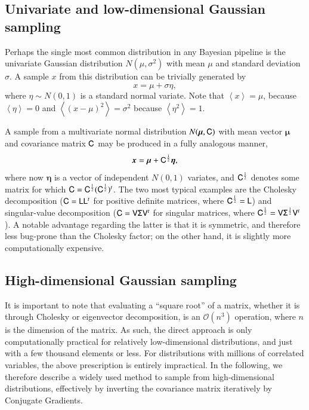 \documentclass[twocolumn]{aa}
\newcommand{\V}[0]{\tens{V}}
\newcommand{\x}[0]{\vec{x}}
\renewcommand{\L}[0]{\tens{L}}
\renewcommand{\C}[0]{\tens{C}}
\begin{document}
\subsection{Univariate and low-dimensional Gaussian sampling}
\label{sec:gauss_lowdim}

Perhaps the single most common distribution in any Bayesian pipeline
is the univariate Gaussian distribution $N(\mu,\sigma^2)$ with mean
$\mu$ and standard deviation $\sigma$. A sample $x$ from this
distribution can be trivially generated by
\begin{equation}
  x = \mu + \sigma \eta,
\end{equation}
where $\eta\sim N(0,1)$ is a standard normal variate. Note that
$\left<x\right> = \mu$, because $\left<\eta\right> = 0$ and
$\left<(x-\mu)^2\right> = \sigma^2$ because $\left<\eta^2\right> = 1$.

A sample from a multivariate normal distribution $N(\boldsymbol{\mu}, \C)$
with mean vector $\boldsymbol{\mu}$ and covariance matrix $\C$ may be
produced in a fully analogous manner,
\begin{equation}
  \x = \boldsymbol{\mu} + \C^{\frac{1}{2}} \boldsymbol{\eta},
\end{equation}
where now $\boldsymbol{\eta}$ is a vector of independent $N(0,1)$ variates,
and $\C^{\frac{1}{2}}$ denotes some matrix for which $\C =
\C^{\frac{1}{2}}(\C^{\frac{1}{2}})^t$. The two most typical examples
are the Cholesky decomposition ($\C = \L\L^t$ for positive definite
matrices, where $\C^{\frac{1}{2}} = \L$) and singular-value
decomposition ($\C = \V\tens\Sigma\V^t$ for singular matrices, where
$\C^{\frac{1}{2}} = \V\tens\Sigma^{\frac{1}{2}}\V^t$). A notable advantage
regarding the latter is that it is symmetric, and therefore less
bug-prone than the Cholesky factor; on the other hand, it is slightly
more computationally expensive.

\subsection{High-dimensional Gaussian sampling}
\label{sec:gauss_highdim}

It is important to note that evaluating a ``square root'' of a matrix,
whether it is through Cholesky or eigenvector decomposition, is an
$\mathcal{O}(n^3)$ operation, where $n$ is the dimension of the
matrix. As such, the direct approach is only computationally
practical for relatively low-dimensional distributions, and just with
a few thousand elements or less. For distributions with millions of
correlated variables, the above prescription is entirely
impractical. In the following, we therefore describe a widely used
method to sample from high-dimensional distributions, effectively by
inverting the covariance matrix iteratively by Conjugate Gradients.
\end{document}
